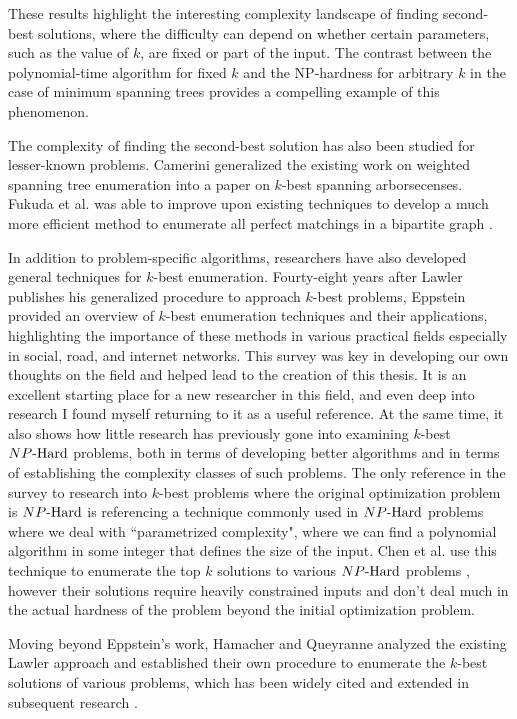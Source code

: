 These results highlight the interesting complexity landscape of finding second-best solutions, where the difficulty can depend on whether certain parameters, such as the value of $k$, are fixed or part of the input. The contrast between the polynomial-time algorithm for fixed $k$ and the NP-hardness for arbitrary $k$ in the case of minimum spanning trees provides a compelling example of this phenomenon.

The complexity of finding the second-best solution has also been studied for lesser-known problems. Camerini \cite{camerini1980complexity} generalized the existing work on weighted spanning tree enumeration into a paper on $k$-best spanning arborsecenses. Fukuda et al. was able to improve upon existing techniques to develop a much more efficient method to enumerate all perfect matchings in a bipartite graph \cite{fukuda1997finding}.

In addition to problem-specific algorithms, researchers have also developed general techniques for $k$-best enumeration. Fourty-eight years after Lawler publishes his generalized procedure to approach $k$-best problems, Eppstein \cite{eppstein2014k} provided an overview of $k$-best enumeration techniques and their applications, highlighting the importance of these methods in various practical fields especially in social, road, and internet networks. This survey was key in developing our own thoughts on the field and helped lead to the creation of this thesis. It is an excellent starting place for a new researcher in this field, and even deep into research I found myself returning to it as a useful reference. At the same time, it also shows how little research has previously gone into examining $k$-best ${NP\text{-Hard{}}}$ problems, both in terms of developing better algorithms and in terms of establishing the complexity classes of such problems. The only reference in the survey to research into $k$-best problems where the original optimization problem is ${NP\text{-Hard{}}}$ is referencing a technique commonly used in ${NP\text{-Hard{}}}$ problems where we deal with ``parametrized complexity", where we can find a polynomial algorithm in some integer that defines the size of the input. Chen et al. use this technique to enumerate the top $k$ solutions to various ${NP\text{-Hard{}}}$ problems \cite{chen2013par}, however their solutions require heavily constrained inputs and don't deal much in the actual hardness of the problem beyond the initial optimization problem.

Moving beyond Eppstein's work, Hamacher and Queyranne \cite{hamacher1982k} analyzed the existing Lawler approach and established their own procedure to enumerate the $k$-best solutions of various problems, which has been widely cited and extended in subsequent research \cite{yen2005finding, pascoal2013k}.

